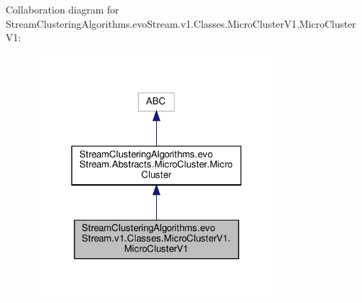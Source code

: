 Collaboration diagram for Stream\+Clustering\+Algorithms.\+evo\+Stream.\+v1.\+Classes.\+Micro\+Cluster\+V1.\+Micro\+Cluster\+V1\+:\nopagebreak
\begin{figure}[H]
\begin{center}
\leavevmode
\includegraphics[width=259pt]{classStreamClusteringAlgorithms_1_1evoStream_1_1v1_1_1Classes_1_1MicroClusterV1_1_1MicroClusterV1__coll__graph}
\end{center}
\end{figure}
